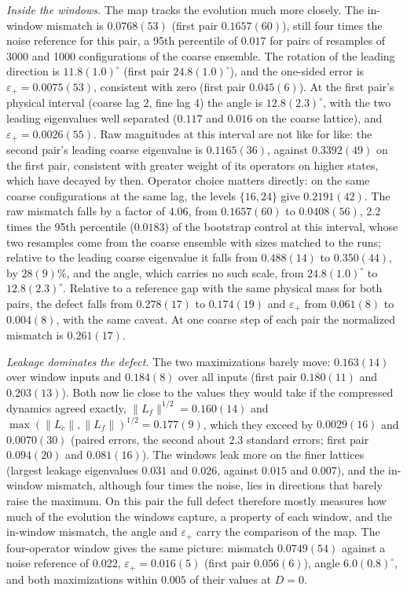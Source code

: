 \documentclass[11pt]{article}
\newcommand{\eps}{\varepsilon}
\begin{document}
\emph{Inside the windows.} The map tracks the evolution much more closely. The in-window mismatch is
$0.0768(53)$ (first pair $0.1657(60)$), still four times the noise reference for this pair, a 95th
percentile of $0.017$ for pairs of resamples of 3000 and 1000 configurations of the coarse ensemble. The
rotation of the leading direction is $11.8(1.0)^\circ$ (first pair $24.8(1.0)^\circ$), and the one-sided
error is $\eps_+=0.0075(53)$, consistent with zero (first pair $0.045(6)$). At the first pair's physical
interval (coarse lag 2, fine lag 4) the angle is $12.8(2.3)^\circ$, with the two leading eigenvalues well
separated ($0.117$ and $0.016$ on the coarse lattice), and $\eps_+=0.0026(55)$. Raw magnitudes at this
interval are not like for like: the second pair's leading coarse eigenvalue is $0.1165(36)$, against
$0.3392(49)$ on the first pair, consistent with greater weight of its operators on higher states, which
have decayed by then. Operator choice matters directly: on the same coarse configurations at the same lag,
the levels $\{16,24\}$ give $0.2191(42)$. The raw mismatch falls by a factor of $4.06$, from $0.1657(60)$
to $0.0408(56)$, 2.2 times the 95th percentile ($0.0183$) of the bootstrap control at this interval, whose
two resamples come from the coarse ensemble with sizes matched to the runs; relative to the leading coarse eigenvalue it falls from $0.488(14)$ to $0.350(44)$, by
$28(9)\%$, and the angle, which carries no such scale, from $24.8(1.0)^\circ$ to $12.8(2.3)^\circ$. Relative to
a reference gap with the same physical mass for both pairs, the defect falls from $0.278(17)$ to
$0.174(19)$ and $\eps_+$ from $0.061(8)$ to $0.004(8)$, with the same caveat. At one coarse step of each
pair the normalized mismatch is $0.261(17)$.

\emph{Leakage dominates the defect.} The two maximizations barely move: $0.163(14)$ over window inputs
and $0.184(8)$ over all inputs (first pair $0.180(11)$ and $0.203(13)$). Both now lie close to the values
they would take if the compressed dynamics agreed exactly, $\|L_f\|^{1/2}=0.160(14)$ and
$\max(\|L_c\|,\|L_f\|)^{1/2}=0.177(9)$, which they exceed by $0.0029(16)$ and $0.0070(30)$ (paired errors,
the second about 2.3 standard errors; first pair $0.094(20)$ and $0.081(16)$). The windows leak more on the finer lattices (largest leakage
eigenvalues $0.031$ and $0.026$, against $0.015$ and $0.007$), and the in-window mismatch, although four
times the noise, lies in directions that barely raise the maximum. On this pair the full defect
therefore mostly measures how much of the evolution the windows capture, a property of each window, and the
in-window mismatch, the angle and $\eps_+$ carry the comparison of the map. The four-operator window
gives the same picture: mismatch $0.0749(54)$ against a noise reference of $0.022$, $\eps_+=0.016(5)$
(first pair $0.056(6)$), angle $6.0(0.8)^\circ$, and both maximizations within $0.005$ of their values at
$D=0$.
\end{document}
